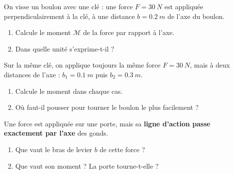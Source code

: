 \documentclass[11pt,a4paper]{article}
\newcommand{\vv}[1]{\vec{#1}}\newcommand{\ds}{\displaystyle}
\begin{document}
\begin{exo}
On visse un boulon avec une clé : une force $F=\qty{30}{N}$ est appliquée perpendiculairement à la
clé, à une distance $b=\qty{0.2}{m}$ de l'axe du boulon.
\begin{center}
\end{center}
\begin{enumerate}[label=\alph*)]
  \item Calcule le moment $\mathcal{M}$ de la force par rapport à l'axe.
  \item Dans quelle unité s'exprime-t-il ?
\end{enumerate}
\end{exo}

\begin{exo}
Sur la même clé, on applique toujours la même force $F=\qty{30}{N}$, mais à deux distances de l'axe :
$b_1=\qty{0.1}{m}$ puis $b_2=\qty{0.3}{m}$.
\begin{enumerate}[label=\alph*)]
  \item Calcule le moment dans chaque cas.
  \item Où faut-il pousser pour tourner le boulon le plus facilement ?
\end{enumerate}
\end{exo}

\begin{exo}
Une force est appliquée sur une porte, mais sa \textbf{ligne d'action passe exactement par l'axe} des
gonds.
\begin{center}
\end{center}
\begin{enumerate}[label=\alph*)]
  \item Que vaut le bras de levier $b$ de cette force ?
  \item Que vaut son moment ? La porte tourne-t-elle ?
\end{enumerate}
\end{exo}
\end{document}
